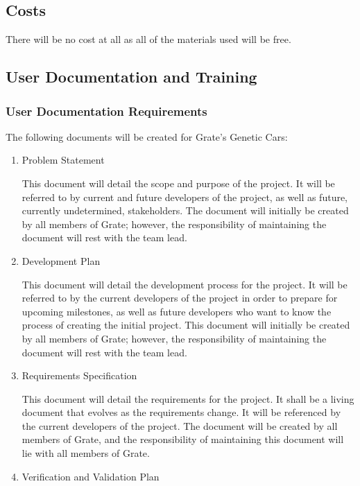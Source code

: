\documentclass[12pt, titlepage]{article}
\begin{document}
\subsection{Costs}
There will be no cost at all as all of the materials used will be free.

\subsection{User Documentation and Training}

\subsubsection{User Documentation Requirements}
The following documents will be created for Grate's Genetic Cars:

\begin{enumerate}

\item{Problem Statement}

This document will detail the scope and purpose of the project. It will be 
referred to by current and future developers of the project, as well as future, 
currently undetermined, stakeholders. The document will initially be created by 
all members of Grate; however, the responsibility of maintaining the document 
will rest with the team lead.

\item{Development Plan}

This document will detail the development process for the project. It will be 
referred to by the current developers of the project in order to prepare for 
upcoming milestones, as well as future developers who want to know the process 
of creating the initial project. This document will initially be created by all 
members of Grate; however, the responsibility of maintaining the document will 
rest with the team lead.

\item{Requirements Specification}

This document will detail the requirements for the project. It shall be a living 
document that evolves as the requirements change. It will be referenced by the 
current developers of the project. The document will be created by all members 
of Grate, and the responsibility of maintaining this document will lie with all 
members of Grate. 

\item{Verification and Validation Plan}


\end{enumerate}
\end{document}
